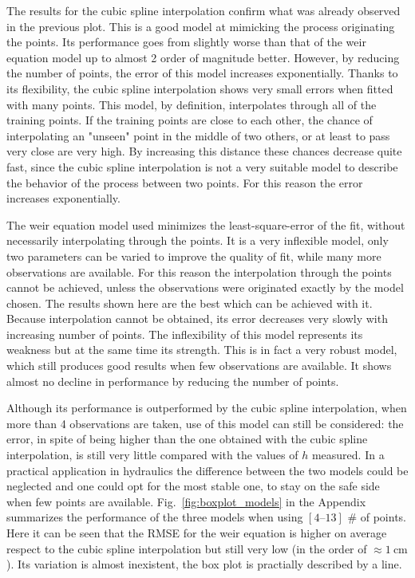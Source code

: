 The results for the cubic spline interpolation confirm what was already observed in the previous plot.
This is a good model at mimicking the process originating the points.
Its performance goes from slightly worse than that of the weir equation model up to almost \num{2} order of magnitude better.
However, by reducing the number of points, the error of this model increases exponentially.
Thanks to its flexibility, the cubic spline interpolation shows very small errors when fitted with many points.
This model, by definition, interpolates through all of the training points.
If the training points are close to each other, the chance of interpolating an "unseen" point in the middle of two others, or at least to pass very close are very high.
By increasing this distance these chances decrease quite fast, since the cubic spline interpolation is not a very suitable model to describe the behavior of the process between two points.
For this reason the error increases exponentially.

The weir equation model used minimizes the least-square-error of the fit, without necessarily interpolating through the points.
It is a very inflexible model, only two parameters can be varied to improve the quality of fit, while many more observations are available.
For this reason the interpolation through the points cannot be achieved, unless the observations were originated exactly by the model chosen.
The results shown here are the best which can be achieved with it.
Because interpolation cannot be obtained, its error decreases very slowly with increasing number of points.
The inflexibility of this model represents its weakness but at the same time its strength.
This is in fact a very robust model, which still produces good results when few observations are available.
It shows almost no decline in performance by reducing the number of points.

Although its performance is outperformed by the cubic spline interpolation, when more than \num{4} observations are taken, use of this model can still be considered: the error, in spite of being higher than the one obtained with the cubic spline interpolation, is still very little compared with the values of $h$ measured.
In a practical application in hydraulics the difference between the two models could be neglected and one could opt for the most stable one, to stay on the safe side when few points are available.
Fig.~\ref{fig:boxplot_models} in the Appendix summarizes the performance of the three models when using $[\numrange{4}{13}]$ \# of points.
Here it can be seen that the RMSE for the weir equation is higher on average respect to the cubic spline interpolation but still very low (in the order of $\approx \SI{1}{\centi\meter}$).
Its variation is almost inexistent, the box plot is practially described by a line.\\

